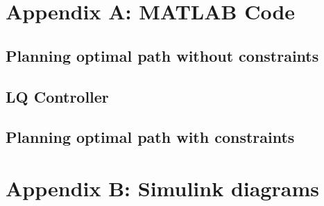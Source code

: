 
\begin{appendices}
\section{Appendix A: MATLAB Code}
\label{appendix:A}

\subsection{Planning optimal path without constraints}


\subsection{LQ Controller}


\subsection{Planning optimal path with constraints}




\section{Appendix B: Simulink diagrams}
\label{appendix:B}


\end{appendices}
